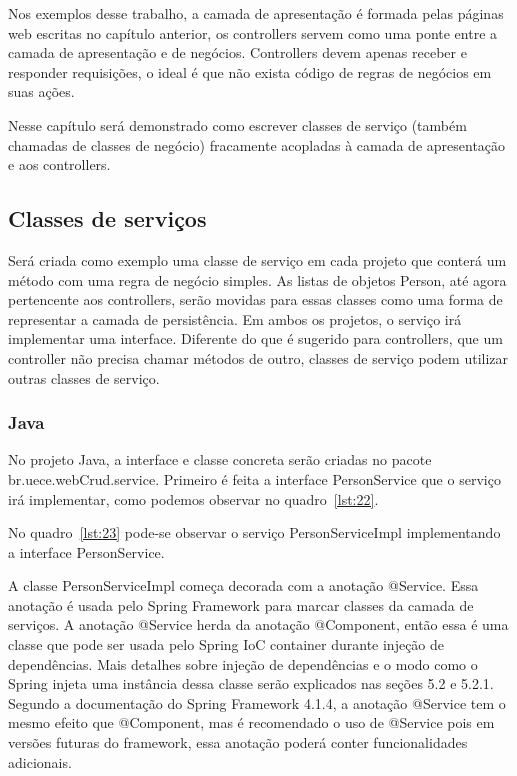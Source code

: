 \documentclass[a4paper,12pt]{article}
\newcommand{\javacode}[3] {
	
}
\begin{document}
Nos exemplos desse trabalho, a camada de apresentação é formada pelas páginas web escritas no capítulo anterior, os controllers servem como uma ponte entre a camada de apresentação e de negócios. Controllers devem apenas receber e responder requisições, o ideal é que não exista código de regras de negócios em suas ações.

Nesse capítulo será demonstrado como escrever classes de serviço (também chamadas de classes de negócio) fracamente acopladas à camada de apresentação e aos controllers. 

\subsection{Classes de serviços}

Será criada como exemplo uma classe de serviço em cada projeto que conterá um método com uma regra de negócio simples. As listas de objetos Person, até agora pertencente aos controllers, serão movidas para essas classes como uma forma de representar a camada de persistência. Em ambos os projetos, o serviço irá implementar uma interface. Diferente do que é sugerido para controllers, que um controller não precisa chamar métodos de outro, classes de serviço podem utilizar outras classes de serviço.

\subsubsection{Java}

No projeto Java, a interface e classe concreta serão criadas no pacote br.uece.webCrud.service. Primeiro é feita a interface PersonService que o serviço irá implementar, como podemos observar no quadro~\ref{lst:22}.

\javacode{code/22.txt}{Interface PersonService}{lst:22}

No quadro~\ref{lst:23} pode-se observar o serviço PersonServiceImpl implementando a interface PersonService.

\javacode{code/23.txt}{Classe PersonServiceImpl}{lst:23}

A classe PersonServiceImpl começa decorada com a anotação @Service. Essa anotação é usada pelo Spring Framework para marcar classes da camada de serviços. A anotação @Service herda da anotação @Component, então essa é uma classe que pode ser usada pelo Spring IoC container durante injeção de dependências. Mais detalhes sobre injeção de dependências e o modo como o Spring injeta uma instância dessa classe serão explicados nas seções 5.2 e 5.2.1. Segundo a documentação do Spring Framework 4.1.4, a anotação @Service tem o mesmo efeito que @Component, mas é recomendado o uso de @Service pois em versões futuras do framework, essa anotação poderá conter funcionalidades adicionais.
\end{document}
